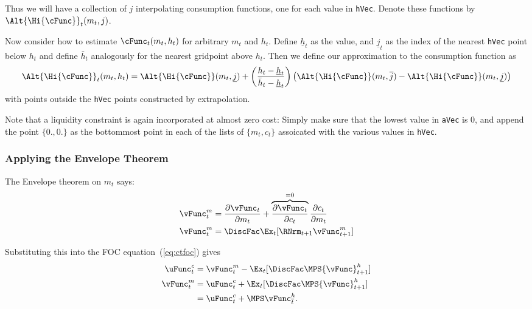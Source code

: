 \documentclass[titlepage, headings=optiontotocandhead]{\econtex}
\begin{document}
{  Thus we will have a collection of $j$ interpolating consumption
  functions, one for each value in \texttt{hVec}.  Denote these
  functions by $\Alt{\Hi{\cFunc}}_{t}({m}_{t},j)$.

  Now consider how to estimate $\cFunc_{t}({m}_{t},h_{t})$ for arbitrary
  ${m}_{t}$ and $h_{t}$.  Define $\underline{h}_{t}$ as the value, and
  $\underline{j}_{t}$ as the index of the nearest \texttt{hVec} point
  below $h_{t}$ and define $\bar{h}_{t}$ analogously for the nearest
  gridpoint above $h_{t}$.  Then we define our approximation to the
  consumption function as
  \begin{displaymath}
    \Alt{\Hi{\cFunc}}_{t}({m}_{t},h_{t}) =
    \Alt{\Hi{\cFunc}}({m}_{t},\underline{j})+\left(\frac{h_{t}-\underline{h}_{t}}
      {\bar{h}_{t}-\underline{h}_{t}}\right)
    \left(\Alt{\Hi{\cFunc}}({m}_{t},\overline{j})
      -\Alt{\Hi{\cFunc}}({m}_{t},\underline{j})\right)
  \end{displaymath}
  with points outside the \texttt{hVec} points constructed by
  extrapolation.

  Note that a liquidity constraint is again incorporated at almost
  zero cost: Simply make sure that the lowest value in
  \texttt{aVec} is 0, and append the point $\{0.,0.\}$ as the
  bottommost point in each of the lists of $\{{m}_{t},{c}_{t}\}$
  assoicated with the various values in \texttt{hVec}.

  \hypertarget{Applying-the-Envelope-Theorem}{}
  \subsubsection{Applying the Envelope Theorem}
  The Envelope theorem on ${m}_{t}$ says:
  \begin{equation}\begin{gathered}\begin{aligned}
        {\vFunc}^{m}_{t}  & = \frac{\partial {\vFunc}_{t}}{\partial {m}_{t}} + \overbrace{\frac{\partial {\vFunc}_{t}}{\partial {c}_{t}}}^{=0}\frac{\partial {c}_{t}}{\partial {m}_{t}} \label{eq:vxt} \\
        {\vFunc}_{t}^{m}  & = \DiscFac  \Ex_{t} [\RNrm_{t+1} {\vFunc}_{t+1}^{m}] \label{eq:envelopex}
      \end{aligned}\end{gathered}\end{equation}

  Substituting this into the FOC equation~(\ref{eq:ctfoc}) gives
  \begin{equation}\begin{gathered}\begin{aligned}
        \uFunc^{c}_{t}  & = {\vFunc}_{t}^{m}-\Ex_{t}[\DiscFac \MPS {\vFunc}_{t+1}^{h}] \label{eq:ctfocsubx}
        \\ {\vFunc}_{t}^{m}  & = \uFunc^{c}_{t}+\Ex_{t}[\DiscFac \MPS {\vFunc}_{t+1}^{h}] \label{eq:vtfoc}
        \\            & = \uFunc^{c}_{t}+\MPS \vEOPt^{h} \label{eq:vxtformula}.
      \end{aligned}\end{gathered}\end{equation}

}
\end{document}
